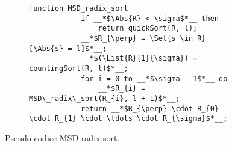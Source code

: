 \documentclass{subfiles}
\begin{document}
\begin{figure}[h!]
    \centering
    \begin{subfigure}[b]{0.35\textwidth}
        \begin{lstlisting}[language = PSEUDO]
            function MSD_radix_sort
            if __*$\Abs{R} < \sigma$*__ then 
                return quickSort(R, l);
            __*$R_{\perp} = \Set{s \in R}[\Abs{s} = l]$*__;
            __*$(\List{R}{1}{\sigma}) = countingSort(R, l)$*__;
            for i = 0 to __*$\sigma - 1$*__ do
                __*$R_{i} = MSD\_radix\_sort(R_{i}, l + 1)$*__;
            return __*$R_{\perp} \cdot R_{0} \cdot R_{1} \cdot \ldots \cdot R_{\sigma}$*__;  
        \end{lstlisting}
    \end{subfigure}
    \caption{Pseudo codice MSD radix sort.}
    \label{Fig:7}
\end{figure}
\end{document}
